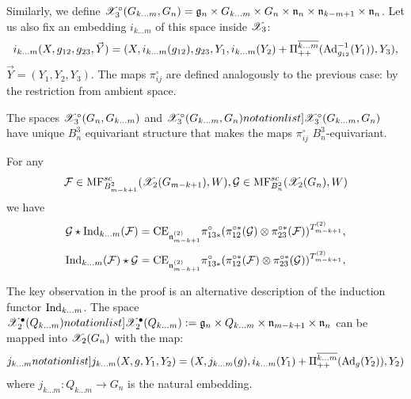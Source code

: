 Similarly, we define $\mathscr{X}^\circ_3(G_{k\dots m},G_n)=\mathfrak{g}_n\times G_{k\dots m}\times G_n\times \mathfrak{n}_n\times \mathfrak{n}_{k-m+1}\times \mathfrak{n}_n$. Let us also fix an embedding $i_{k\dots m}$ of this space inside $\mathscr{X}_3$:
$$ i_{k\dots m}(X,g_{12},g_{23},\vec{Y})=(X,i_{k\dots m}(g_{12}),g_{23},Y_1,i_{k\dots m}(Y_2)+\Pi_{++}^{\overline{k\dots m}}({\rm Ad}^{-1}_{g_{12}}(Y_1)),Y_3),$$
\(\vec{Y}=(Y_1,Y_2,Y_3)\).
The maps $\pi_{ij}^{\circ}$ are defined analogously to the previous case: by the restriction from ambient space.

The spaces $\mathscr{X}^\circ_3(G_n,G_{k\dots m})$ and $\SymbolPrint{\calX^\circ_3(G_{k\dots m},G_n)}$ have unique $B_n^3$ equivariant structure that makes the maps $\pi_{ij}^\circ$ $B_n^3$-equivariant.

\begin{lemma}\label{prop: small flag}  For any \[\mathcal{F}\in \mathrm{MF}^{sc}_{B_{m-k+1}^2}(\mathscr{X}_2(G_{m-k+1}),W),\mathcal{G}\in \mathrm{MF}^{sc}_{B_n^2}(\mathscr{X}_2(G_n),W)\] we have
$$ \mathcal{G}\star\mathrm{Ind}_{k\dots m}(\mathcal{F})=\mathrm{CE}_{\mathfrak{n}_{m-k+1}^{(2)}}\pi_{13*}^\circ(\pi_{12}^{\circ*}(\mathcal{G})\otimes \pi_{23}^{\circ*}(\mathcal{F}))^{T^{(2)}_{m-k+1}},$$
$$ \mathrm{Ind}_{k\dots m}(\mathcal{F})\star \mathcal{G}=\mathrm{CE}_{\mathfrak{n}_{m-k+1}^{(2)}}\pi_{13*}^\circ(\pi_{12}^{\circ*}(\mathcal{F})\otimes \pi_{23}^{\circ*}(\mathcal{G}))^{T^{(2)}_{m-k+1}},$$
\end{lemma}
The key observation in the proof is an alternative description of the induction functor $\mathrm{Ind}_{k\dots m}$. The space $\SymbolPrint{\calX^\bullet_2(Q_{k\dots m})}:=
\frg_n\times Q_{k\dots m}\times \frn_{m-k+1}\times \frn_n$ can be mapped into
$\mathscr{X}_2(G_n)$ with the map:
\[ \SymbolPrint{j_{k\dots m}}(X,g,Y_1,Y_2)=(X,j_{k\dots m}(g),i_{k\dots m}(Y_1)+\Pi_{++}^{\overline{k\dots m}}(\Ad_g(Y_2)),Y_2)\]
where \(j_{k\dots m}: Q_{k\dots m}\to G_n\) is the natural embedding.

